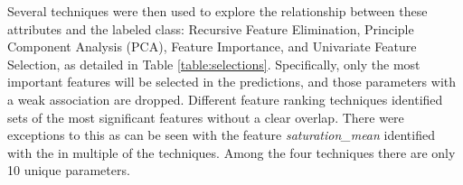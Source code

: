 \documentclass[letterpaper]{report}
\begin{document}
Several techniques were then used to explore the relationship between these attributes and the labeled class: Recursive Feature Elimination, Principle Component Analysis (PCA), Feature Importance, and Univariate Feature Selection, as detailed in Table \ref{table:selections}.  Specifically, only the most important features will be selected in the predictions, and those parameters with a weak association are dropped. Different feature ranking techniques identified sets of the most significant features without a clear overlap. There were exceptions to this as can be seen with the feature \textit{saturation\_mean} identified with the in multiple of the techniques. Among the four techniques there are only 10 unique parameters.

%
%
%
% 

{
\begin{small}
\renewcommand{\arraystretch}{0.9}
\setlength\LTleft{0pt}
\setlength\LTright{0pt}






\end{small}
}
\end{document}
